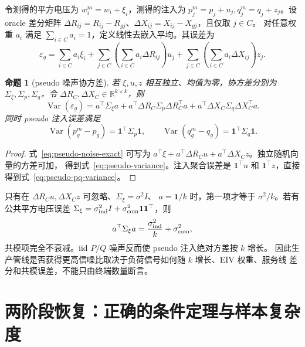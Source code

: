\documentclass[UTF8,11pt]{ctexart}
\newtheorem{proposition}[definition]{命题}
\newcommand{\R}{\mathbb R}
\begin{document}
令测得的平方电压为 $w_i^m=w_i+\xi_i$，测得的注入为
$p_j^m=p_j+u_j,q_j^m=q_j+z_j$。设 oracle 差分矩阵
$\Delta R_{ij}=R_{ij}-R_{gj}$、$\Delta X_{ij}=X_{ij}-X_{gj}$，且仅取 $j\in C$。
对任意权重 $a_i$ 满足 $\sum_{i\in C}a_i=1$，定义线性去嵌入平均。其误差为
\begin{equation}
 \varepsilon_g
 =\sum_{i\in C}a_i\xi_i
 +\sum_{j\in C}\left(\sum_{i\in C}a_i\Delta R_{ij}\right)u_j
 +\sum_{j\in C}\left(\sum_{i\in C}a_i\Delta X_{ij}\right)z_j.
 \label{eq:pseudo-noise-exact}
\end{equation}

\begin{proposition}[pseudo 噪声协方差]
\label{prop:pseudo-noise}
若 $\xi,u,z$ 相互独立、均值为零，协方差分别为
$\Sigma_\xi,\Sigma_p,\Sigma_q$，令 $\Delta R_C,\Delta X_C\in\R^{k\times k}$，则
\begin{equation}
 \operatorname{Var}(\varepsilon_g)
 =a^\top\Sigma_\xi a
 +a^\top\Delta R_C\Sigma_p\Delta R_C^\top a
 +a^\top\Delta X_C\Sigma_q\Delta X_C^\top a.
 \label{eq:pseudo-variance}
\end{equation}
同时 pseudo 注入误差满足
\begin{equation}
 \operatorname{Var}(p_g^m-p_g)=\bm1^\top\Sigma_p\bm1,
 \qquad
 \operatorname{Var}(q_g^m-q_g)=\bm1^\top\Sigma_q\bm1.
 \label{eq:pseudo-pq-variance}
\end{equation}
\end{proposition}

\begin{proof}
式~\eqref{eq:pseudo-noise-exact} 可写为
$a^\top\xi+a^\top\Delta R_Cu+a^\top\Delta X_Cz$。独立随机向量的方差可加，
得到式~\eqref{eq:pseudo-variance}。注入聚合误差是 $\bm1^\top u$ 和
$\bm1^\top z$，直接得到式~\eqref{eq:pseudo-pq-variance}。
\end{proof}

只有在 $\Delta R_Cu,\Delta X_Cz$ 可忽略、$\Sigma_\xi=\sigma^2I$、
$a=\bm1/k$ 时，第一项才等于 $\sigma^2/k$。若有公共平方电压误差
$\Sigma_\xi=\sigma_{\rm ind}^2I+\sigma_{\rm com}^2\bm1\bm1^\top$，则
\begin{equation*}
 a^\top\Sigma_\xi a=\frac{\sigma_{\rm ind}^2}{k}+\sigma_{\rm com}^2,
\end{equation*}
共模项完全不衰减。iid $P/Q$ 噪声反而使 pseudo 注入绝对方差按 $k$ 增长。
因此生产管线是否获得更高信噪比取决于负荷信号如何随 $k$ 增长、EIV 权重、服务线
差分和共模误差，不能只由终端数量断言。

\section{两阶段恢复：正确的条件定理与样本复杂度}
\end{document}
